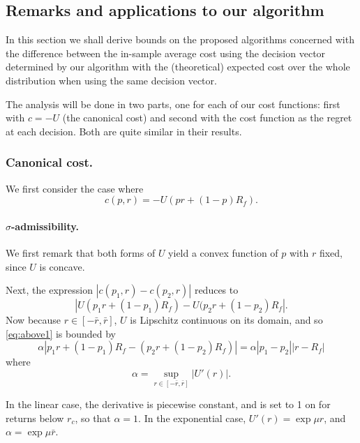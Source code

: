 \subsection{Remarks and applications to our algorithm}

In this section we shall derive bounds on the proposed algorithms concerned with the
difference between the in-sample average cost using the decision vector determined by our
algorithm with the (theoretical) expected cost over the whole distribution when using the
same decision vector. 

The analysis will be done in two parts, one for each of our cost functions: first with
$c=-U$ (the canonical cost) and second with the cost function as the regret at each
decision. Both are quite similar in their results. 

\subsubsection{Canonical cost.}

We first consider the case where 
\begin{equation*}
  c(p,r) = -U(pr + (1-p)R_f).
\end{equation*}

\paragraph{$\sigma$-admissibility.}  We first remark that both forms of $U$ yield a convex
function of $p$ with $r$ fixed, since $U$ is concave.

Next, the expression $|c(p_1,r)-c(p_2,r)|$ reduces to
\begin{equation}
  \label{eq:above1} |U(p_1r + (1-p_1)R_f) - U(p_2r + (1-p_2)R_f|.
\end{equation} Now because $r\in[-\bar r,\bar r]$, $U$ is Lipschitz continuous on its
domain, and so \eqref{eq:above1} is bounded by
\begin{equation}
  \label{eq:above2} 
  \alpha |p_1r + (1-p_1)R_f - (p_2r + (1-p_2)R_f)| = \alpha|p_1-p_2||r-R_f|
\end{equation} 
where
\begin{equation*} 
  \alpha = \sup_{r\in[-\bar r,\bar r]} |U'(r)|.
\end{equation*}

In the linear case, the derivative is piecewise constant, and is set to 1 on for returns
below $r_c$, so that $\alpha=1$. In the exponential case, $U'(r) = \exp\mu r$, and $\alpha
= \exp \mu \bar r$.

